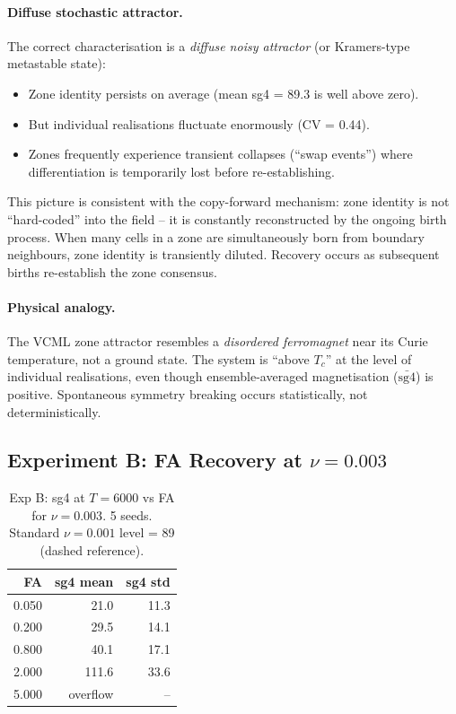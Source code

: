 \documentclass[11pt,a4paper]{article}
\begin{document}
\paragraph{Diffuse stochastic attractor.}
The correct characterisation is a \emph{diffuse noisy attractor} (or Kramers-type
metastable state):
\begin{itemize}
  \item Zone identity persists on average (mean sg4 = 89.3 is well above zero).
  \item But individual realisations fluctuate enormously (CV = 0.44).
  \item Zones frequently experience transient collapses (``swap events'') where
    differentiation is temporarily lost before re-establishing.
\end{itemize}
This picture is consistent with the copy-forward mechanism: zone identity is not
``hard-coded'' into the field -- it is constantly reconstructed by the ongoing birth
process.  When many cells in a zone are simultaneously born from boundary neighbours,
zone identity is transiently diluted.  Recovery occurs as subsequent births re-establish
the zone consensus.

\paragraph{Physical analogy.}
The VCML zone attractor resembles a \emph{disordered ferromagnet} near its Curie
temperature, not a ground state.  The system is ``above $T_c$'' at the level of
individual realisations, even though ensemble-averaged magnetisation ($\bar{\mathrm{sg4}}$)
is positive.  Spontaneous symmetry breaking occurs statistically, not deterministically.

\subsection{Experiment B: FA Recovery at $\nu=0.003$}

\begin{table}[h]
\centering
\caption{Exp B: sg4 at $T=6000$ vs FA for $\nu=0.003$.  5 seeds.
  Standard $\nu=0.001$ level = 89 (dashed reference).}
\label{tab:expB}
\begin{tabular}{r|rr}
\toprule
FA & sg4 mean & sg4 std \\
\midrule
0.050 & 21.0 & 11.3 \\
0.200 & 29.5 & 14.1 \\
0.800 & 40.1 & 17.1 \\
2.000 & 111.6 & 33.6 \\
5.000 & overflow & -- \\
\bottomrule
\end{tabular}
\end{table}
\end{document}
